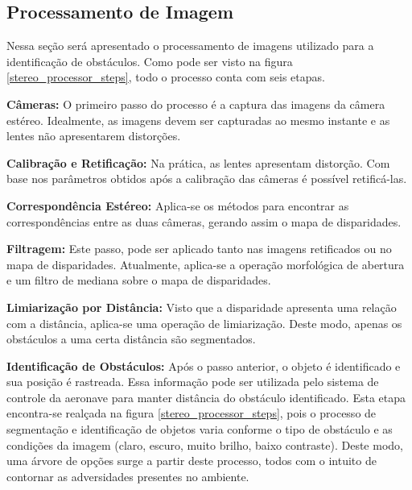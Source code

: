 \subsection{Processamento de Imagem}

Nessa seção será apresentado o processamento de imagens utilizado para a identificação de obstáculos. Como pode ser visto na figura \ref{stereo_processor_steps}, todo o processo conta com seis etapas.

\textbf{Câmeras:} O primeiro passo do processo é a captura das imagens da câmera estéreo. Idealmente, as imagens devem ser capturadas ao mesmo instante e as lentes não apresentarem distorções.   

\textbf{Calibração e Retificação:} Na prática, as lentes apresentam distorção. Com base nos parâmetros obtidos após a calibração das câmeras é possível retificá-las. 

\textbf{Correspondência Estéreo:} Aplica-se os métodos para encontrar as correspondências entre as duas câmeras, gerando assim o mapa de disparidades.

\textbf{Filtragem:} Este passo, pode ser aplicado tanto nas imagens retificados ou no mapa de disparidades. Atualmente, aplica-se a operação morfológica de abertura e um filtro de mediana sobre o mapa de disparidades. 

\textbf{Limiarização por Distância:} Visto que a disparidade apresenta uma relação com a distância, aplica-se uma operação de limiarização. Deste modo, apenas os obstáculos a uma certa distância são segmentados.

\textbf{Identificação de Obstáculos:} Após o passo anterior, o objeto é identificado e sua posição é rastreada. Essa informação pode ser utilizada pelo sistema de controle da aeronave para manter distância do obstáculo identificado. Esta etapa encontra-se realçada na figura \ref{stereo_processor_steps}, pois o processo de segmentação e identificação de objetos varia conforme o tipo de obstáculo e as condições da imagem (claro, escuro, muito brilho, baixo contraste). Deste modo, uma árvore de opções surge a partir deste processo, todos com o intuito de contornar as adversidades presentes no ambiente.

